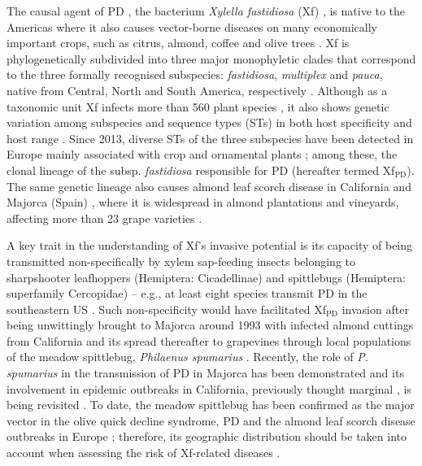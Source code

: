 The causal agent of PD \cite{Davis1978}, the bacterium \textit{Xylella
    fastidiosa} (Xf) \cite{Wells1987}, is native to the Americas where it also
causes vector-borne diseases on many economically important crops, such as
citrus, almond, coffee and olive trees \cite{Almeida2015, Almeida2019}. Xf is
phylogenetically subdivided into three major monophyletic clades that
correspond to the three formally recognised subspecies: \textit{fastidiosa},
\textit{multiplex} and \textit{pauca}, native from Central, North and South
America, respectively \cite{Sicard2018,Vanhove2019}. Although as a taxonomic
unit Xf infects more than 560 plant species \cite{Delbianco2019}, it also shows
genetic variation among subspecies and sequence types (STs) in both host
specificity and host range \cite{Nunney2019}. Since 2013, diverse STs of the
three subspecies have been detected in Europe mainly associated with crop and
ornamental plants \cite{Denance2017, Olmo2017, Saponari2013}; among these, the
clonal lineage of the subsp. \textit{fastidiosa} responsible for PD (hereafter
termed Xf$_{\textrm{PD}}$). The same genetic lineage also causes almond leaf
scorch disease in California \cite{Almeida2003} and Majorca (Spain)
\cite{Moralejo2020}, where it is widespread in almond plantations and
vineyards, affecting more than 23 grape varieties \cite{Moralejo2019}.

A key trait in the understanding of Xf's invasive potential is its capacity of
being transmitted non-specifically by xylem sap-feeding insects belonging to
sharpshooter leafhoppers (Hemiptera: Cicadellinae) and spittlebugs (Hemiptera:
superfamily Cercopidae) \cite{Almeida2016, Cornara2018} -- e.g., at least eight
species transmit PD in the southeastern US \cite{Overall2017}. Such
non-specificity would have facilitated Xf$_{\textrm{PD}}$ invasion after being
unwittingly brought to Majorca around 1993 with infected almond cuttings from
California and its spread thereafter to grapevines through local populations of
the meadow spittlebug, \textit{Philaenus spumarius} \cite{Moralejo2020}.
Recently, the role of \textit{P. spumarius} in the transmission of PD in
Majorca has been demonstrated \cite{Moralejo2019} and its involvement in
epidemic outbreaks in California, previously thought marginal \cite{Redak2004,
    Severin1950}, is being revisited \cite{Cornara2016, Beal2021}. To date, the
meadow spittlebug has been confirmed as the major vector in the olive quick
decline syndrome, PD and the almond leaf scorch disease outbreaks in Europe
\cite{Cornara2018, Cornara2019,Moralejo2019, Moralejo2020}; therefore, its
geographic distribution should be taken into account when assessing the risk of
Xf-related diseases \cite{Godefroid2021}.


